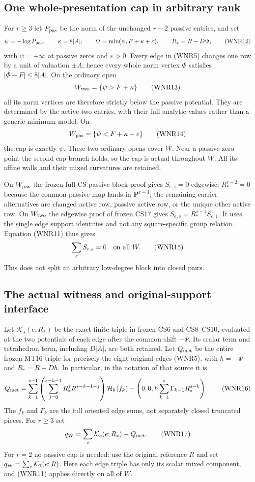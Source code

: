 \subsection{One whole-presentation cap in arbitrary rank}

For $r\ge3$ let $P_{\rm pas}$ be the norm of the unchanged $r-2$
passive entries, and set
\[
 \psi=-\log P_{\rm pas},\qquad
 \kappa=8|A|,\qquad
 \Psi=\min(\psi,F+\kappa+\varepsilon),\qquad
 R_*=R-D\Psi,
 \tag{WNR12}
\]
with $\psi=+\infty$ at passive zeros and $\varepsilon>0$.  Every
edge in (WNR5) changes one row by a unit of valuation $\pm A$;
hence every whole norm vertex $\Phi$ satisfies
$|\Phi-F|\le8|A|$.  On the ordinary open
\[
 W_{\rm two}=\{\psi>F+\kappa\}
 \tag{WNR13}
\]
all its norm vertices are therefore strictly below the passive
potential.  They are determined by the active two entries, with
their full analytic values rather than a generic-minimum model.
On
\[
 W_{\rm pas}=\{\psi<F+\kappa+\varepsilon\}
 \tag{WNR14}
\]
the cap is exactly $\psi$.  These two ordinary opens cover $W$.
Near a passive-zero point the second cap branch holds, so the cap
is actual throughout $W$.  All its affine walls and their mixed
curvatures are retained.

On $W_{\rm pas}$ the frozen full CS passive-block proof gives
$S_{e,s}=0$ edgewise: $R_*^{r-2}=0$ because the common passive
map lands in $\mathbf P^{r-3}$; the remaining carrier alternatives
are changed active row, passive active row, or the unique other
active row.  On $W_{\rm two}$ the edgewise proof of frozen CS17
gives $S_{e,s}=R_*^{s-1}S_{e,1}$.  It uses the single edge support
identities and not any square-specific group relation.  Equation
(WNR11) thus gives
\[
                           \sum_eS_{e,s}=0\quad\hbox{on all }W.
 \tag{WNR15}
\]
This does not split an arbitrary low-degree block into closed pairs.

\subsection{The actual witness and original-support interface}

Let $\mathcal K_s(e;R_*)$ be the exact finite triple in frozen
CS6 and CS8--CS10, evaluated at the two potentials of each edge
after the common shift $-\Psi$.  Its scalar term and tetrahedron
term, including $D|A|$, are both retained.  Let $Q_{\rm met}$ be
the entire frozen MT16 triple for precisely the eight original
edges (WNR5), with $h=-\Psi$ and $R_*=R+Dh$.  In particular, in
the notation of that source it is
\[
 Q_{\rm met}=
 \sum_{k=1}^{s-1}\left(\sum_{j=0}^{s-k-1}R_*^jR^{s-k-1-j}\right)
                      \mathcal H_h(f_k)
 -\left(0,0,h\sum_{k=1}^s\Gamma_{k-1}R_*^{s-k}\right).
 \tag{WNR16}
\]
The $f_k$ and $\Gamma_k$ are the full oriented edge sums, not
separately closed truncated pieces.  For $r\ge3$ set
\[
                         q_{\rm W}=\sum_e\mathcal K_s(e;R_*)-Q_{\rm met}.
 \tag{WNR17}
\]
For $r=2$ no passive cap is needed: use the original reference $R$
and set $q_{\rm W}=\sum_e\mathcal K_1(e;R)$.  Here each edge
triple has only its scalar mixed component, and (WNR11) applies
directly on all of $W$.

